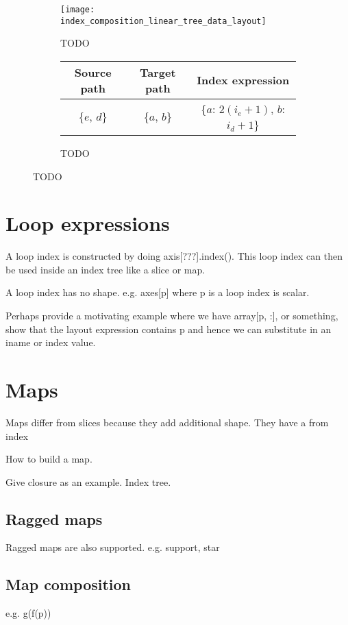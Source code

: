 \documentclass[thesis]{subfiles}
\begin{document}
\begin{figure}
  \centering
  \begin{subfigure}{\textwidth}
    \centering
    \texttt{[image: index\_composition\_linear\_tree\_data\_layout]}
    \caption{TODO}
    \label{fig:index_composition_linear_tree_data_layout}
  \end{subfigure}

  \vspace{1em}

  \begin{subfigure}{\textwidth}
    \centering
    \begin{tabular}{c|c|c}
      \textbf{Source path} & \textbf{Target path} & \textbf{Index expression} \\
      \hline
      \{$e$, $d$\} & \{$a$, $b$\} & \{$a$: $2 (i_e+1)$, $b$: $i_d+1$\} \\
    \end{tabular}
    \caption{TODO}
    \label{fig:index_composition_linear_tree_exprs}
  \end{subfigure}

  \caption{TODO}
  \label{fig:index_composition_linear_tree_all}
\end{figure}


\section{Loop expressions}


A loop index is constructed by doing axis[???].index().
This loop index can then be used inside an index tree like a slice or map.

A loop index has no shape. e.g. axes[p] where p is a loop index is scalar.

Perhaps provide a motivating example where we have array[p, :], or something, show that the layout expression contains p and hence we can substitute in an iname or index value.


\section{Maps}

Maps differ from slices because they add additional shape. They have a from index

How to build a map.

Give closure as an example. Index tree.

\subsection{Ragged maps}

Ragged maps are also supported. e.g. support, star

\subsection{Map composition}

e.g. g(f(p))
\end{document}
